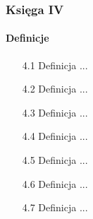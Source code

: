 %

\subsubsection{Księga IV}
\paragraph{Definicje}
\begin{enumerate}
	\item [4.1] Definicja ...
	\item [4.2] Definicja ...
	\item [4.3] Definicja ...
	\item [4.4] Definicja ...
	\item [4.5] Definicja ...
	\item [4.6] Definicja ...
	\item [4.7] Definicja ...
\end{enumerate}

